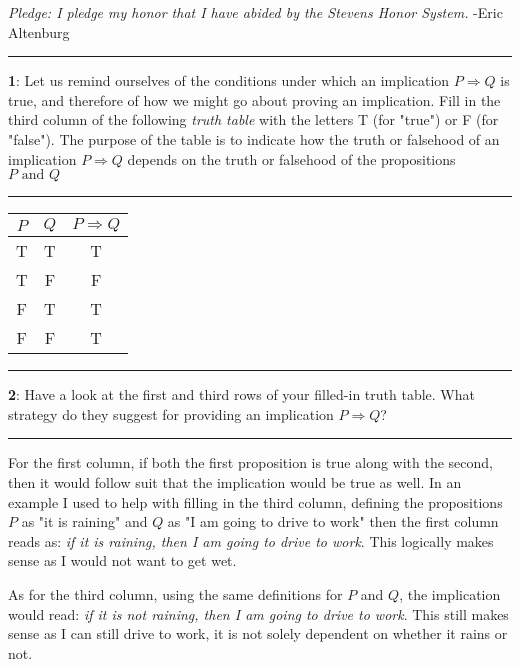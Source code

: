 \documentclass[11pt]{article}
\newcommand\question[2]{\vspace{.25in}\hrule\textbf{#1}: #2\vspace{.5em}\hrule\vspace{.10in}}
\begin{document}
\raggedright
\newcommand\NAME{Eric Altenburg}  %
\newcommand\COURSE{MA-240}
\newcommand\HWNUM{1}              %


\textit{Pledge: I pledge my honor that I have abided by the Stevens Honor System.} -Eric Altenburg

\question{1}{Let us remind ourselves of the conditions under which an implication $P \Rightarrow Q$ is true, and therefore of how we might go about proving an implication. Fill in the third column of the following \textit{truth table} with the letters T (for "true") or F (for "false"). The purpose of the table is to indicate how the truth or falsehood of an implication $P \Rightarrow Q$ depends on the truth or falsehood of the propositions $P \text{ and } Q$}
	\begin{table}[!h]
		\centering
		\begin{tabular}{|c|c|c|}
		\hline
		$P$ & $Q$ & $P \Rightarrow Q$\\
		\hline
		T & T & T\\
		\hline
		T & F & F\\
		\hline
		F & T & T\\
		\hline
		F & F & T\\
		\hline
		\end{tabular}
	\end{table}


\question{2}{Have a look at the first and third rows of your filled-in truth table. What strategy do they suggest for providing an implication $P \Rightarrow Q$?}
	For the first column, if both the first proposition is true along with the second, then it would follow suit that the implication would be true as well. In an example I used to help with filling in the third column, defining the propositions $P$ as "it is raining" and $Q$ as "I am going to drive to work" then the first column reads as: \textit{if it is raining, then I am going to drive to work}. This logically makes sense as I would not want to get wet.

	As for the third column, using the same definitions for $P$ and $Q$, the implication would read: \textit{if it is not raining, then I am going to drive to work}. This still makes sense as I can still drive to work, it is not solely dependent on whether it rains or not. 
\end{document}
